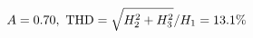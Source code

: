 \documentclass[preview]{standalone}
\begin{document}
\begin{align*}
\special{dvisvgm:raw <g id='unique000'>}A=0.70,\ \text{THD}=\sqrt{H_2^2+H_3^2}/H_1=13.1\%\special{dvisvgm:raw </g>}
\end{align*}
\end{document}
